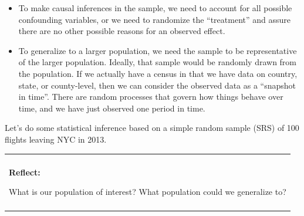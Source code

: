 \documentclass[
]{book}
\newenvironment{Shaded}{\begin{snugshade}}{\end{snugshade}}
\newcommand{\CommentTok}[1]{\textcolor[rgb]{0.56,0.35,0.01}{\textit{#1}}}
\newcommand{\DataTypeTok}[1]{\textcolor[rgb]{0.13,0.29,0.53}{#1}}
\newcommand{\DecValTok}[1]{\textcolor[rgb]{0.00,0.00,0.81}{#1}}
\newcommand{\KeywordTok}[1]{\textcolor[rgb]{0.13,0.29,0.53}{\textbf{#1}}}
\newcommand{\NormalTok}[1]{#1}
\newcommand{\OperatorTok}[1]{\textcolor[rgb]{0.81,0.36,0.00}{\textbf{#1}}}
\newcommand{\StringTok}[1]{\textcolor[rgb]{0.31,0.60,0.02}{#1}}
\providecommand{\tightlist}{%
  \setlength{\itemsep}{0pt}\setlength{\parskip}{0pt}}
\newenvironment{reflect}
{
    \begin{center}
    
    \begin{tabular}{|p{0.8\textwidth}|}
    \rowcolor{LightBlue}
    \hline\\
    \rowcolor{LightBlue}
    \textbf{Reflect:}
}
{
    \\\rowcolor{LightBlue}
    \\\hline
    \end{tabular} 
    \end{center}
}
\begin{document}
\begin{itemize}
\tightlist
\item
  To make causal inferences in the sample, we need to account for all possible confounding variables, or we need to randomize the ``treatment'' and assure there are no other possible reasons for an observed effect.
\item
  To generalize to a larger population, we need the sample to be representative of the larger population. Ideally, that sample would be randomly drawn from the population. If we actually have a census in that we have data on country, state, or county-level, then we can consider the observed data as a ``snapshot in time''. There are random processes that govern how things behave over time, and we have just observed one period in time.
\end{itemize}

Let's do some statistical inference based on a simple random sample (SRS) of 100 flights leaving NYC in 2013.

\begin{reflect}
What is our population of interest? What population could we generalize
to?
\end{reflect}

\begin{Shaded}
\end{Shaded}
\end{document}
